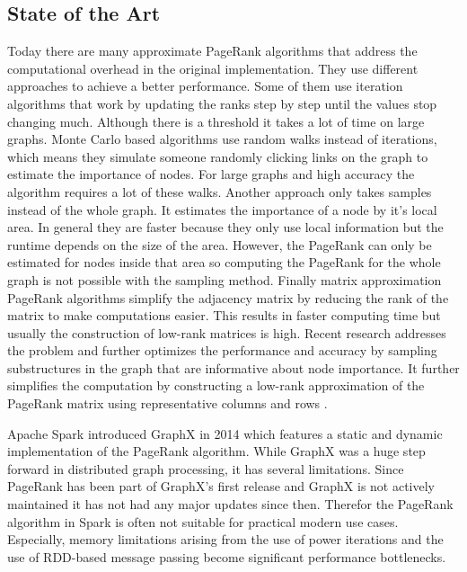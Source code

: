 \documentclass[a4paper,12pt]{article}
\begin{document}
\begin{multicols}{2}
\section{State of the Art}
Today there are many approximate PageRank algorithms that address the computational overhead in the original implementation. They use different approaches to achieve a better performance. Some of them use iteration algorithms that work by updating the ranks step by step until the values stop changing much. Although there is a threshold it takes a lot of time on large graphs. Monte Carlo based algorithms use random walks instead of iterations, which means they simulate someone randomly clicking links on the graph to estimate the importance of nodes. For large graphs and high accuracy the algorithm requires a lot of these walks. Another approach only takes samples instead of the whole graph. It estimates the importance of a node by it's local area. In general they are faster because they only use local information but the runtime depends on the size of the area. However, the PageRank can only be estimated for nodes inside that area so computing the PageRank for the whole graph is not possible with the sampling method. Finally matrix approximation PageRank algorithms simplify the adjacency matrix by reducing the rank of the matrix to make computations easier. This results in faster computing time but usually the construction of low-rank matrices is high. Recent research addresses the problem and further optimizes the performance and accuracy by sampling substructures in the graph that are informative about node importance. It further simplifies the computation by constructing a low-rank approximation of the PageRank matrix using representative columns and rows \cite{wu_efficient_2024}. 

Apache Spark introduced GraphX in 2014 which features a static and dynamic implementation of the PageRank algorithm. While GraphX was a huge step forward in distributed graph processing, it has several limitations. Since PageRank has been part of GraphX's first release and GraphX is not actively maintained it has not had any major updates since then. Therefor the PageRank algorithm in Spark is often not suitable for practical modern use cases. Especially, memory limitations arising from the use of power iterations and the use of RDD-based message passing become significant performance bottlenecks.
 


\end{multicols}
\end{document}
